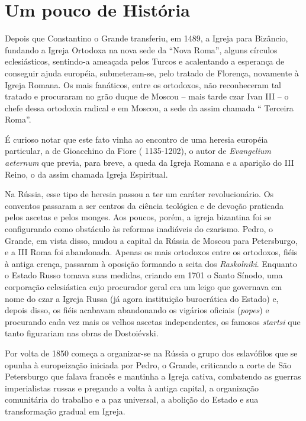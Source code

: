 \section{Um pouco de História}

Depois que Constantino o Grande transferiu, em 1489, a Igreja para
Bizâncio, fundando a Igreja Ortodoxa na nova sede da ``Nova Roma'',
alguns círculos eclesiásticos, sentindo-a ameaçada pelos Turcos e
acalentando a esperança de conseguir ajuda européia, submeteram-se, pelo
tratado de Florença, novamente à Igreja Romana. Os mais fanáticos, entre
os ortodoxos, não reconheceram tal tratado e procuraram no grão duque de
Moscou -- mais tarde czar Ivan III -- o chefe dessa ortodoxia radical e
em Moscou, a sede da assim chamada `` Terceira Roma''.

É curioso notar que este fato vinha ao encontro de uma heresia européia
particular, a de Gioacchino da Fiore ( 1135-1202), o autor de
\emph{Evangelium aeternum} que previa, para breve, a queda da Igreja
Romana e a aparição do III Reino, o da assim chamada Igreja Espiritual.

Na Rússia, esse tipo de heresia passou a ter um caráter revolucionário.
Os conventos passaram a ser centros da ciência teológica e de devoção
praticada pelos ascetas e pelos monges. Aos poucos, porém, a igreja
bizantina foi se configurando como obstáculo às reformas inadiáveis do
czarismo. Pedro, o Grande, em vista disso, mudou a capital da Rússia de
Moscou para Petersburgo, e a III Roma foi abandonada. Apenas os mais
ortodoxos entre os ortodoxos, fiéis à antiga crença, passaram à oposição
formando a seita dos \emph{Raskolniki}. Enquanto o Estado Russo tomava
suas medidas, criando em 1701 o Santo Sínodo, uma corporação
eclesiástica cujo procurador geral era um leigo que governava em nome do
czar a Igreja Russa (já agora instituição burocrática do Estado) e,
depois disso, os fiéis acabavam abandonando os vigários oficiais
(\emph{popes}) e procurando cada vez mais os velhos ascetas
independentes, os famosos \emph{startsi} que tanto figurariam nas obras
de Dostoiévski.

Por volta de 1850 começa a organizar-se na Rússia o grupo dos
eslavófilos que se opunha à europeização iniciada por Pedro, o Grande,
criticando a corte de São Petersburgo que falava francês e mantinha a
Igreja cativa, combatendo as guerras imperialistas russas e pregando a
volta à antiga capital, a organização comunitária do trabalho e a paz
universal, a abolição do Estado e sua transformação gradual em Igreja.

